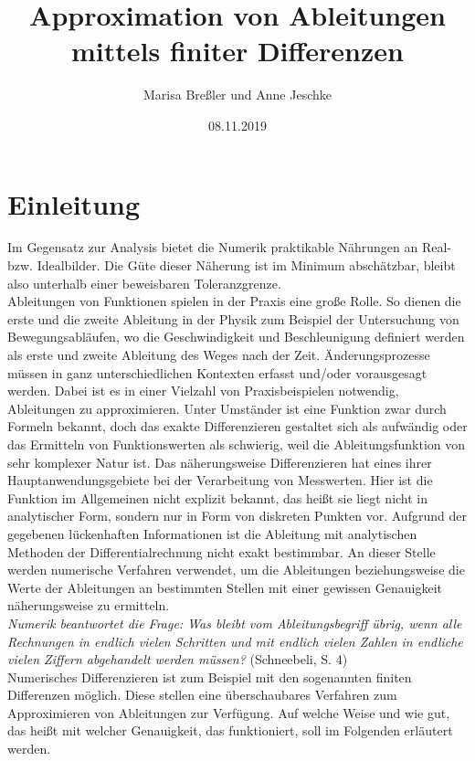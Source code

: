 \documentclass{scrartcl}
\begin{document}
\title{Approximation von Ableitungen\\mittels finiter Differenzen}
\author{Marisa Breßler und Anne Jeschke}
\date{08.11.2019}
\maketitle
\tableofcontents
\pagebreak \section{Einleitung}
\label{sec:einleitung}
Im Gegensatz zur Analysis bietet die Numerik praktikable Nährungen an Real- bzw. Idealbilder. Die Güte dieser Näherung ist im Minimum abschätzbar, bleibt also unterhalb einer beweisbaren Toleranzgrenze. \\
Ableitungen von Funktionen spielen in der Praxis eine große Rolle. So dienen die erste und die zweite Ableitung in der Physik zum Beispiel der Untersuchung von Bewegungsabläufen, wo die Geschwindigkeit und Beschleunigung definiert werden als erste und zweite Ableitung des Weges nach der Zeit. Änderungsprozesse müssen in ganz unterschiedlichen Kontexten erfasst und/oder vorausgesagt werden. Dabei ist es in einer Vielzahl von Praxisbeispielen notwendig, Ableitungen zu approximieren. Unter Umständer ist eine Funktion zwar durch Formeln bekannt, doch das exakte Differenzieren gestaltet sich als aufwändig oder das Ermitteln von Funktionswerten als schwierig, weil die Ableitungsfunktion von sehr komplexer Natur ist. Das näherungsweise Differenzieren hat eines ihrer Hauptanwendungsgebiete bei der Verarbeitung von Messwerten. Hier ist die Funktion im Allgemeinen nicht explizit bekannt, das heißt sie liegt nicht in analytischer Form, sondern nur in Form von diskreten Punkten vor. Aufgrund der gegebenen lückenhaften Informationen ist die Ableitung mit analytischen Methoden der Differentialrechnung nicht exakt bestimmbar. An dieser Stelle werden numerische Verfahren verwendet, um die Ableitungen beziehungsweise die Werte der Ableitungen an bestimmten Stellen mit einer gewissen Genauigkeit näherungsweise zu ermitteln. \\
\linebreak
\textit{Numerik beantwortet die Frage: Was bleibt vom Ableitungsbegriff übrig, wenn alle Rechnungen in endlich vielen Schritten und mit endlich vielen Zahlen in endliche vielen Ziffern abgehandelt werden müssen?} (Schneebeli, S. 4)\\
\linebreak
Numerisches Differenzieren ist zum Beispiel mit den sogenannten finiten Differenzen möglich. Diese stellen eine überschaubares Verfahren zum Approximieren von Ableitungen zur Verfügung. Auf welche Weise und wie gut, das heißt mit welcher Genauigkeit, das funktioniert, soll im Folgenden erläutert werden. \\
\end{document}
